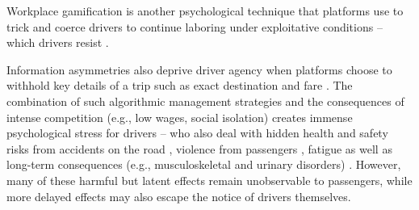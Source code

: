 Workplace gamification is another psychological technique that platforms use to trick and coerce drivers to continue laboring under exploitative conditions \cite{making_out, prabowo2019does, tricks} -- which drivers resist \cite{vasudevangame}. 

Information asymmetries also deprive driver agency when platforms choose to withhold key details of a trip such as exact destination and fare \cite{asymmetries}. The combination of such algorithmic management strategies and the consequences of intense competition (e.g., low wages, social isolation) creates immense psychological stress for drivers \cite{stressfulride, distress} -- who also deal with hidden health and safety risks from accidents on the road \cite{pilot, crashes}, violence from passengers \cite{brush, festering}, fatigue \cite{fatigue} as well as long-term consequences (e.g., musculoskeletal and urinary disorders) \cite{acute, stressfulride}. However, many of these harmful but latent effects remain unobservable to passengers, while more delayed effects may also escape the notice of drivers themselves.



